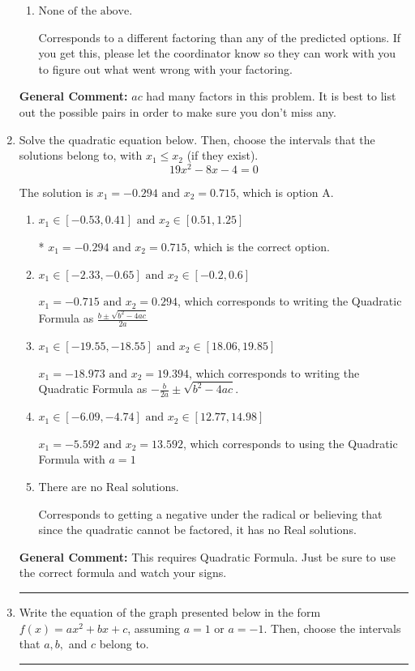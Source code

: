 \documentclass{extbook}[14pt]
\newcommand{\litem}[1]{\item #1

\rule{\textwidth}{0.4pt}}
\begin{document}
\begin{enumerate}
{\begin{enumerate}[label=\Alph*.]
 $(12x + 5)(3x + 5)$, which corresponds to associating some factor of a to c.
\item \( \text{None of the above.} \)

 Corresponds to a different factoring than any of the predicted options. If you get this, please let the coordinator know so they can work with you to figure out what went wrong with your factoring.
\end{enumerate}

\textbf{General Comment:} $ac$ had many factors in this problem. It is best to list out the possible pairs in order to make sure you don't miss any.
}
\litem{
Solve the quadratic equation below. Then, choose the intervals that the solutions belong to, with $x_1 \leq x_2$ (if they exist).
\[ 19x^{2} -8 x -4 = 0 \]

The solution is \( x_1 = -0.294 \text{ and } x_2 = 0.715 \), which is option A.\begin{enumerate}[label=\Alph*.]
\item \( x_1 \in [-0.53, 0.41] \text{ and } x_2 \in [0.51, 1.25] \)

* $x_1 = -0.294 \text{ and } x_2 = 0.715$, which is the correct option.
\item \( x_1 \in [-2.33, -0.65] \text{ and } x_2 \in [-0.2, 0.6] \)

 $x_1 = -0.715 \text{ and } x_2 = 0.294$, which corresponds to writing the Quadratic Formula as $\frac{b \pm \sqrt{b^2 - 4ac}}{2a}$
\item \( x_1 \in [-19.55, -18.55] \text{ and } x_2 \in [18.06, 19.85] \)

 $x_1 = -18.973 \text{ and } x_2 = 19.394$, which corresponds to writing the Quadratic Formula as $-\frac{b}{2a} \pm \sqrt{b^2 - 4ac}$.
\item \( x_1 \in [-6.09, -4.74] \text{ and } x_2 \in [12.77, 14.98] \)

 $x_1 = -5.592 \text{ and } x_2 = 13.592$, which corresponds to using the Quadratic Formula with $a=1$
\item \( \text{There are no Real solutions.} \)

Corresponds to getting a negative under the radical or believing that since the quadratic cannot be factored, it has no Real solutions.
\end{enumerate}

\textbf{General Comment:} This requires Quadratic Formula. Just be sure to use the correct formula and watch your signs.
}
\litem{
Write the equation of the graph presented below in the form $f(x)=ax^2+bx+c$, assuming  $a=1$ or $a=-1$. Then, choose the intervals that $a, b,$ and $c$ belong to.

}
\end{enumerate}
\end{document}
